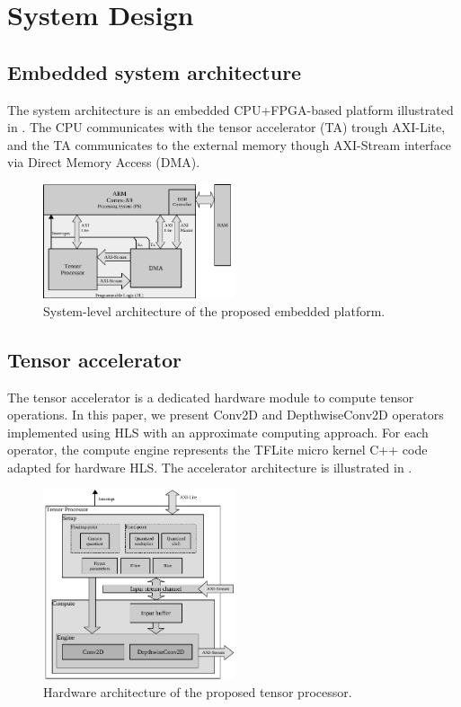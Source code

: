 \section{System Design}
\label{sec:system_design}
\subsection{Embedded system architecture}
The system architecture is an embedded CPU+FPGA-based platform illustrated in . The CPU communicates with the tensor accelerator (TA) trough AXI-Lite, and the TA communicates to the external memory though AXI-Stream interface via Direct Memory Access (DMA).
\begin{figure}[t!]
	\centering
	\includegraphics[width=0.5\textwidth]{../figures/system_design.pdf}
	\caption{System-level architecture of the proposed embedded platform.}
	\label{fig:system_architecture}
\end{figure}

\subsection{Tensor accelerator}
The tensor accelerator is a dedicated hardware module to compute tensor operations. In this paper, we present Conv2D and DepthwiseConv2D operators implemented using HLS with an approximate computing approach. For each operator, the compute engine represents the TFLite micro kernel C++ code adapted for hardware HLS. The accelerator architecture is illustrated in .

\begin{figure}[t!]
	\centering
	\includegraphics[width=0.5\textwidth]{../figures/accelerator.pdf}
	\caption{Hardware architecture of the proposed tensor processor.}
	\label{fig:accelerator}
\end{figure}

